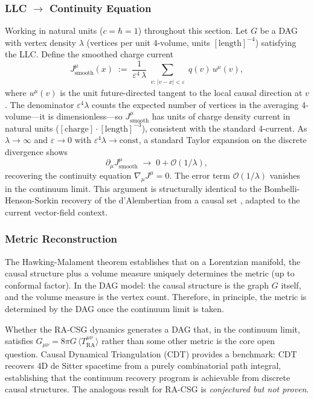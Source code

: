 \documentclass[11pt,a4paper]{article}
\theoremstyle{plain}
\theoremstyle{definition}
\theoremstyle{remark}
\newcommand{\Tact}{T^{\mu\nu}_{\mathrm{RA}}}
\begin{document}
\subsubsection{LLC \texorpdfstring{$\to$}{→} Continuity Equation}

Working in natural units ($c = \hbar = 1$) throughout this section.
Let $G$ be a DAG with vertex density $\lambda$ (vertices per unit 4-volume, units
$[\text{length}]^{-4}$) satisfying the LLC. Define the smoothed charge current
\begin{equation}
  J^{\mu}_{\mathrm{smooth}}(x)
  \;:=\;
  \frac{1}{\varepsilon^{4}\,\lambda}
  \sum_{\substack{v:\,|v-x|<\varepsilon}} q(v)\,u^{\mu}(v),
\end{equation}
where $u^{\mu}(v)$ is the unit future-directed tangent to the local causal
direction at $v$. The denominator $\varepsilon^{4}\lambda$ counts the expected
number of vertices in the averaging 4-volume---it is dimensionless---so
$J^{\mu}_{\mathrm{smooth}}$ has units of charge density current in natural units
($[\text{charge}]\cdot[\text{length}]^{-3}$), consistent with the standard
4-current. As $\lambda \to \infty$ and $\varepsilon \to 0$ with
$\varepsilon^{4}\lambda \to \mathrm{const}$, a standard Taylor expansion on the
discrete divergence shows
\begin{equation}
  \partial_{\mu}J^{\mu}_{\mathrm{smooth}} \;\to\; 0 + \mathcal{O}(1/\lambda),
\end{equation}
recovering the continuity equation $\nabla_{\mu}J^{\mu} = 0$. The error term
$\mathcal{O}(1/\lambda)$ vanishes in the continuum limit. This argument is
structurally identical to the Bombelli-Henson-Sorkin recovery of the d'Alembertian
from a causal set \citep{Bombelli2009}, adapted to the current vector-field context.

\subsubsection{Metric Reconstruction}

The Hawking-Malament theorem establishes that on a Lorentzian manifold, the causal
structure plus a volume measure uniquely determines the metric (up to conformal
factor). In the DAG model: the causal structure is the graph $G$ itself, and the
volume measure is the vertex count. Therefore, in principle, the metric is
determined by the DAG once the continuum limit is taken.

Whether the RA-CSG dynamics generates a DAG that, in the continuum limit, satisfies
$G_{\mu\nu} = 8\pi G\,\langle\Tact\rangle$ rather than some other metric is the
core open question. Causal Dynamical Triangulation (CDT) \citep{Ambjorn2012}
provides a benchmark: CDT recovers 4D de Sitter spacetime from a purely
combinatorial path integral, establishing that the continuum recovery program is
achievable from discrete causal structures. The analogous result for RA-CSG is
\emph{conjectured but not proven}.
\end{document}
